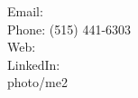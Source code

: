 \documentclass[letterpaper,11pt]{article}
\begin{document}


{
    Email:  \\
    Phone: (515) 441-6303\\
    Web:  \\ 
    LinkedIn:  \\
}
{photo/me2}













\end{document}
